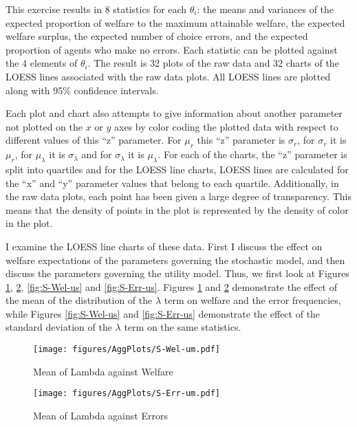 \documentclass[../main.tex]{subfiles}
\begin{document}
This exercise results in 8 statistics for each $\theta_i$: the means and variances of the expected proportion of welfare to the maximum attainable welfare, the expected welfare surplus, the expected number of choice errors, and the expected proportion of agents who make no errors.
Each statistic can be plotted against the 4 elements of $\theta_i$.
The result is 32 plots of the raw data and 32 charts of the LOESS lines associated with the raw data plots.
All LOESS lines are plotted along with 95\% confidence intervals.

Each plot and chart also attempts to give information about another parameter not plotted on the $x$ or $y$ axes by color coding the plotted data with respect to different values of this \enquote{z} parameter.
For $\mu_r$ this \enquote{z} parameter is $\sigma_r$, for $\sigma_r$ it is $\mu_r$, for $\mu_\lambda$ it is $\sigma_\lambda$ and for $\sigma_\lambda$ it is $\mu_\lambda$.
For each of the charts, the \enquote{z} parameter is split into quartiles and for the LOESS line charts, LOESS lines are calculated for the \enquote{x} and \enquote{y} parameter values that belong to each quartile.
Additionally, in the raw data plots, each point has been given a large degree of transparency.
This means that the density of points in the plot is represented by the density of color in the plot.

I examine the LOESS line charts of these data.
First I discuss the effect on welfare expectations of the parameters governing the stochastic model, and then discuss the parameters governing the utility model.
Thus, we first look at Figures \ref{fig:S-Wel-um}, \ref{fig:S-Err-um}, \ref{fig:S-Wel-us} and \ref{fig:S-Err-us}.
Figures \ref{fig:S-Wel-um} and \ref{fig:S-Err-um} demonstrate the effect of the mean of the distribution of the $\lambda$ term on welfare and the error frequencies, while Figures \ref{fig:S-Wel-us} and \ref{fig:S-Err-us} demonstrate the effect of the standard deviation of the $\lambda$ term on the same statistics.


\begin{figure}[h!]
	\center
	\caption{Mean of Lambda against Welfare}
	\texttt{[image: figures/AggPlots/S-Wel-um.pdf]}
	\label{fig:S-Wel-um}
\end{figure}

\begin{figure}[h!]
	\center
	\caption{Mean of Lambda against Errors}
	\texttt{[image: figures/AggPlots/S-Err-um.pdf]}
	\label{fig:S-Err-um}
\end{figure}
\end{document}
